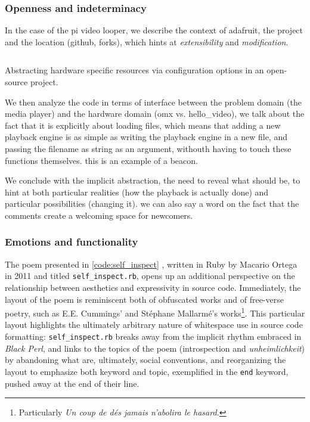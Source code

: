 \subsubsection{Openness and indeterminacy}
\label{subsubsec:openness-indeterminacy}

In the case of the pi video looper, we describe the context of adafruit, the project and the location (github, forks), which hints at \emph{extensibility} and \emph{modification}.

\begin{listing}
  \inputminted{python}{./corpus/pi_video_looper.py}
  \caption{Abstracting hardware specific resources via configuration options in an open-source project. \citep{dicola_pi_2015}}
  \label{code:pi-video-looper}
\end{listing}

We then analyze the code in terms of interface between the problem domain (the media player) and the hardware domain (omx vs. hello\_video), we talk about the fact that it is explicitly about loading files, which means that adding a new playback engine is as simple as writing the playback engine in a new file, and passing the filename as string as an argument, withouth having to touch these functions themselves. this is an example of a beacon.

We conclude with the implicit abstraction, the need to reveal what should be, to hint at both particular realities (how the playback is actually done) and particular possibilities (changing it). we can also say a word on the fact that the comments create a welcoming space for newcomers.


\subsubsection{Emotions and functionality}
\label{subsubsec:emotions-functionality}

The poem presented in \ref{code:self_inspect} , written in Ruby by Macario Ortega in 2011 and titled \lstinline{self_inspect.rb}, opens up an additional perspective on the relationship between aesthetics and expressivity in source code. Immediately, the layout of the poem is reminiscent both of obfuscated works and of free-verse poetry, such as E.E. Cummings' and Stéphane Mallarmé's works\footnote{Particularly \emph{Un coup de dés jamais n'abolira le hasard.}}. This particular layout highlights the ultimately arbitrary nature of whitespace use in source code formatting: \lstinline{self_inspect.rb} breaks away from the implicit rhythm embraced in \emph{Black Perl}, and links to the topics of the poem (introspection and \emph{unheimlichkeit}) by abandoning what are, ultimately, social conventions, and reorganizing the layout to emphasize both keyword and topic, exemplified in the \lstinline{end} keyword, pushed away at the end of their line.

